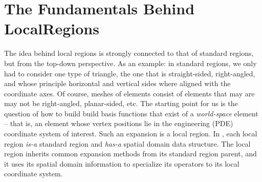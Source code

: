 %
\section{The Fundamentals Behind LocalRegions}

The idea behind local regions is strongly connected to that of standard regions, but from the top-down perspective.  As an example: in standard regions, we only had to consider one type of triangle, the one that is straight-sided, right-angled, and whose principle horizontal and vertical sides where aligned with the coordinate axes.  Of course, meshes of elements consist of elements that may are may not be right-angled, planar-sided, etc.  The starting point for us is the question of how to build build basis functions that exist of a {\em world-space} element -- that is, an element whose vertex positions lie in the engineering (PDE) coordinate system of interest.  Such an expansion is a local region.  In {\nek}, each local region {\em is-a} standard region and {\em has-a} spatial domain data structure.  The local region inherits common expansion methods from its standard region parent, and it uses its spatial domain information to specialize its operators to its local coordinate system.

